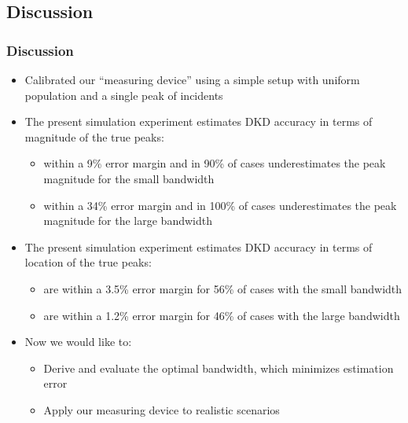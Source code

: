 \documentclass[notheorems]{beamer}
\theoremstyle{definition}
\theoremstyle{example}
\begin{document}
\subsection{Discussion}
\begin{frame}\frametitle{Discussion}
    \footnotesize
    \begin{itemize}
        \item Calibrated our ``measuring device'' using a simple setup with uniform population and a single peak of incidents
        \item The present simulation experiment estimates DKD accuracy in terms of magnitude of the true peaks:
        \begin{itemize}
            \scriptsize
            \item within a 9\% error margin and in 90\% of cases underestimates the peak magnitude for the small bandwidth
            \item within a 34\% error margin and in 100\% of cases underestimates the peak magnitude for the large bandwidth
        \end{itemize}
        \item The present simulation experiment estimates DKD accuracy in terms of location of the true peaks:
        \begin{itemize}
            \scriptsize
            \item are within a 3.5\% error margin for 56\% of cases with the small bandwidth
            \item are within a 1.2\% error margin for 46\% of cases with the large bandwidth
        \end{itemize}
        \item Now we would like to:
        \begin{itemize}
            \scriptsize
            \item Derive and evaluate the optimal bandwidth, which minimizes estimation error
            \item Apply our measuring device to realistic scenarios
        \end{itemize}
    \end{itemize}
\end{frame}
\end{document}
